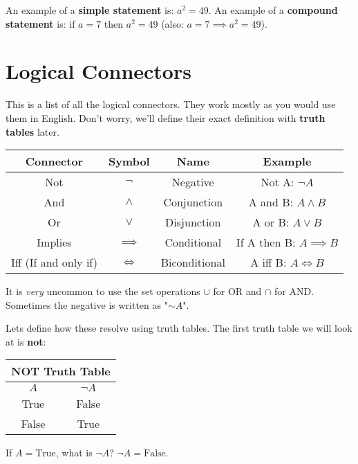 \begin{boxexample}{}{}
	An example of a {\bf simple statement} is: $a^2=49$. An example of a {\bf compound statement} is: if $a=7$ then $a^2=49$ (also: $a=7 \implies a^2=49$). 
\end{boxexample}

\section{Logical Connectors}

This is a list of all the logical connectors. They work mostly as you would use them in English. Don't worry, we'll define their exact definition with {\bf truth tables} later.

\begin{tabular}{c|c|c|c}
	\hline
	Connector & Symbol & Name & Example\\
	\hline
	Not & $\neg$ & Negative & Not A: $\neg A$\\
	And & $\land$ & Conjunction & A and B: $A \land B$\\
	Or & $\lor$ & Disjunction & A or B: $A \lor B$\\
	Implies & $\implies$ & Conditional & If A then B: $A \implies B$\\
	Iff (If and only if) & $\iff$ & Biconditional & A iff B: $A \iff B$\\
\hline
\end{tabular}

\begin{boxnotation*}{}{}
	It is \emph{very} uncommon to use the set operations $\cup$ for OR and $\cap$ for AND. Sometimes the negative is written as "$\sim A$".
\end{boxnotation*}

Lets define how these resolve using truth tables. The first truth table we will look at is {\bf not}:

\begin{tabular}{c|c}
	\hline
	\multicolumn{2}{c}{NOT Truth Table}\\
	\hline
	$A$ & $\neg A$\\
	\hline
	True & False\\
	False & True\\
	\hline
\end{tabular}

\begin{boxexample}{}{}
	If $A=\text{True}$, what is $\neg A$? $\neg A=\text{False}$.
\end{boxexample}

